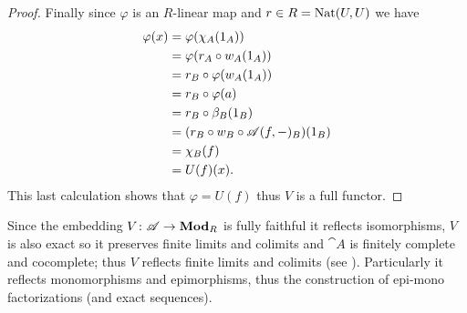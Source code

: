 \begin{proof}
  Finally since \(\varphi\) is an \(R\)-linear map and \(r\in R = \text{\normalfont Nat}(U,U)\) we have
  \begin{align*}
    \varphi(x) &= \varphi(\chi_A(1_A))\\
               &= \varphi(r_A\circ w_A(1_A))\\
               &= r_B\circ\varphi(w_A(1_A))\\
               &= r_B\circ\varphi(a)\\
               &= r_B\circ\beta_B(1_B)\\
               &= (r_B\circ w_B\circ {\mathscr A}(f,-)_B)(1_B)\\
               &= \chi_B(f)\\
               &= U(f)(x).
  \end{align*}
  This last calculation shows that \(\varphi = U(f)\) thus \(V\) is a full functor.
\end{proof}

\begin{remark}
  \label{rem:final_remark}
  Since the embedding \(V\colon {\mathscr A}\to \text{\normalfont\textbf{Mod}}_R\) is fully faithful it reflects isomorphisms, \(V\) is also exact so it preserves finite limits and colimits and \(\cat{A}\) is finitely complete and cocomplete; thus \(V\) reflects finite limits and colimits (see \cite[Proposition 2.9.7]{handbook1}). Particularly it reflects monomorphisms and epimorphisms, thus the construction of epi-mono factorizations (and exact sequences).
\end{remark}

